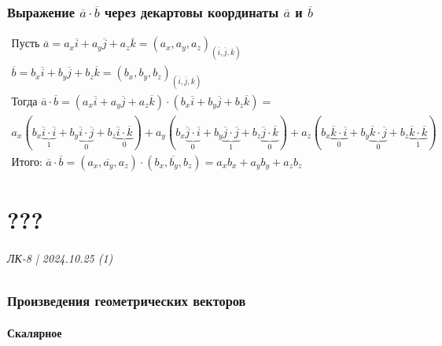 \documentclass{article}
\begin{document}
\section{Выражение $\overline{a} \cdot \overline{b}$ через декартовы координаты $\overline{a}$ и $\overline{b}$}
\begin{gather*}
    \text{Пусть } \overline{a} = a_x \overline{i} + a_y \overline{j} + a_z \overline{k} = 
    (a_x, a_y, a_z)_{(\overline{i}, \overline{j}, \overline{k})} \\
    \overline{b} = b_x \overline{i} + b_y \overline{j} + b_z \overline{k} = 
    (b_x, b_y, b_z)_{(\overline{i}, \overline{j}, \overline{k})} \\
    \text{Тогда } \overline{a} \cdot \overline{b} =
    (a_x \overline{i} + a_y \overline{j} + a_z \overline{k}) \cdot (b_x \overline{i} + b_y \overline{j} + b_z \overline{k}) = \\
    a_x(b_x \underbrace{\overline{i} \cdot \overline{i}}_{1} + b_y \underbrace{\overline{i} \cdot \overline{j}}_{0} + b_z \underbrace{\overline{i} \cdot \overline{k}}_{0}) +
    a_y(b_x \underbrace{\overline{j} \cdot \overline{i}}_{0} + b_y \underbrace{\overline{j} \cdot \overline{j}}_{1} + b_z \underbrace{\overline{j} \cdot \overline{k}}_{0}) +
    a_z(b_x \underbrace{\overline{k} \cdot \overline{i}}_{0} + b_y \underbrace{\overline{k} \cdot \overline{j}}_{0} + b_z \underbrace{\overline{k} \cdot \overline{k}}_{1}) \\
    \text{Итого: } \overline{a} \cdot \overline{b} = (\overline{a_x, a_y, a_z}) \cdot (\overline{b_x, b_y, b_z}) =
    a_x b_x + a_y b_y + a_z b_z
\end{gather*}



\newpage
\part{???}
\paragraph{ЛК-8 | 2024.10.25 (1)}

\section{Произведения геометрических векторов}

\subsection{Скалярное}
\end{document}
